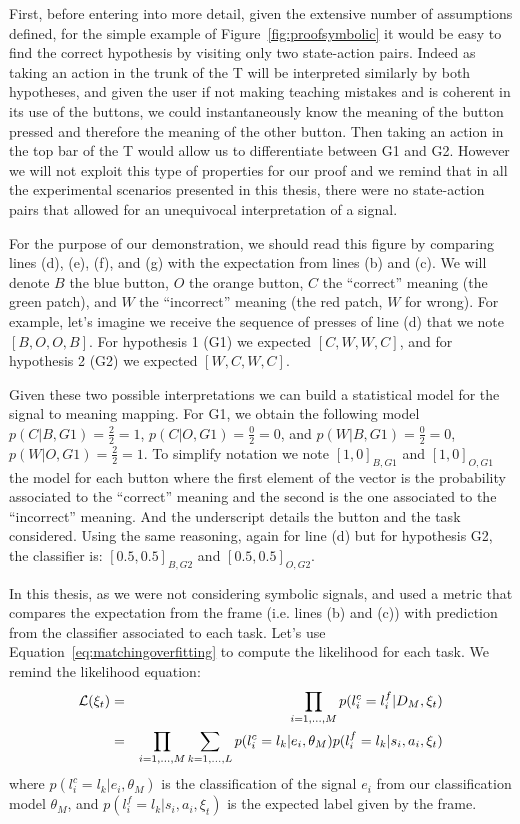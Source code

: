 First, before entering into more detail, given the extensive number of assumptions defined, for the simple example of Figure~\ref{fig:proofsymbolic} it would be easy to find the correct hypothesis by visiting only two state-action pairs. Indeed as taking an action in the trunk of the T will be interpreted similarly by both hypotheses, and given the user if not making teaching mistakes and is coherent in its use of the buttons, we could instantaneously know the meaning of the button pressed and therefore the meaning of the other button. Then taking an action in the top bar of the T would allow us to differentiate between G1 and G2. However we will not exploit this type of properties for our proof and we remind that in all the experimental scenarios presented in this thesis, there were no state-action pairs that allowed for an unequivocal interpretation of a signal.

For the purpose of our demonstration, we should read this figure by comparing lines (d), (e), (f), and (g) with the expectation from lines (b) and (c). We will denote $B$ the blue button, $O$ the orange button, $C$ the ``correct'' meaning (the green patch), and $W$ the ``incorrect'' meaning (the red patch, $W$ for wrong). For example, let's imagine we receive the sequence of presses of line (d) that we note $[B,O,O,B]$. For hypothesis 1 (G1) we expected $[C,W,W,C]$, and for hypothesis 2 (G2) we expected $[W,C,W,C]$. 

Given these two possible interpretations we can build a statistical model for the signal to meaning mapping. For G1, we obtain the following model $p(C|B, G1) = \frac{2}{2} = 1$, $p(C|O, G1) = \frac{0}{2} = 0$, and $p(W|B, G1) = \frac{0}{2} = 0$, $p(W|O, G1) = \frac{2}{2} = 1$. To simplify notation we note $[1,0]_{B,G1}$ and $[1,0]_{O,G1}$ the model for each button where the first element of the vector is the probability associated to the ``correct'' meaning and the second is the one associated to the ``incorrect'' meaning. And the underscript details the button and the task considered. Using the same reasoning, again for line (d) but for hypothesis G2, the classifier is: $[0.5,0.5]_{B,G2}$ and $[0.5,0.5]_{O,G2}$.

In this thesis, as we were not considering symbolic signals, and used a metric that compares the expectation from the frame (i.e. lines (b) and (c)) with prediction from the classifier associated to each task. Let's use Equation~\ref{eq:matchingoverfitting} to compute the likelihood for each task. We remind the likelihood equation:
%
\begin{eqnarray}
\mathcal{L}(\xi_t) &=& \prod_{i = 1,\ldots,M} p(l^c_i = l^f_i | D_M, \xi_t) \nonumber \\ 
&=& \prod_{i = 1,\ldots,M} \sum_{k = 1, \ldots, L} p(l^c_i = l_k | e_i, \theta_M) p(l^f_i = l_k | s_i, a_i, \xi_t) \nonumber
\end{eqnarray}
%
where $p(l^c_i = l_k | e_i, \theta_M)$ is the classification of the signal $e_i$ from our classification model $\theta_M$, and $p(l^f_i = l_k | s_i, a_i, \xi_t)$ is the expected label given by the frame.

